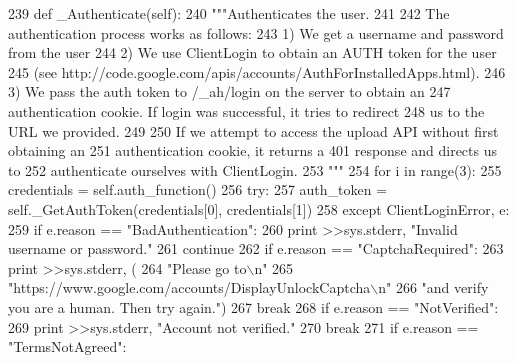 \begin{DoxyCode}
239   \textcolor{keyword}{def }\_Authenticate(self):
240     \textcolor{stringliteral}{"""Authenticates the user.}
241 \textcolor{stringliteral}{}
242 \textcolor{stringliteral}{    The authentication process works as follows:}
243 \textcolor{stringliteral}{     1) We get a username and password from the user}
244 \textcolor{stringliteral}{     2) We use ClientLogin to obtain an AUTH token for the user}
245 \textcolor{stringliteral}{        (see http://code.google.com/apis/accounts/AuthForInstalledApps.html).}
246 \textcolor{stringliteral}{     3) We pass the auth token to /\_ah/login on the server to obtain an}
247 \textcolor{stringliteral}{        authentication cookie. If login was successful, it tries to redirect}
248 \textcolor{stringliteral}{        us to the URL we provided.}
249 \textcolor{stringliteral}{}
250 \textcolor{stringliteral}{    If we attempt to access the upload API without first obtaining an}
251 \textcolor{stringliteral}{    authentication cookie, it returns a 401 response and directs us to}
252 \textcolor{stringliteral}{    authenticate ourselves with ClientLogin.}
253 \textcolor{stringliteral}{    """}
254     \textcolor{keywordflow}{for} i \textcolor{keywordflow}{in} range(3):
255       credentials = self.auth\_function()
256       \textcolor{keywordflow}{try}:
257         auth\_token = self.\_GetAuthToken(credentials[0], credentials[1])
258       \textcolor{keywordflow}{except} ClientLoginError, e:
259         \textcolor{keywordflow}{if} e.reason == \textcolor{stringliteral}{"BadAuthentication"}:
260           \textcolor{keywordflow}{print} >>sys.stderr, \textcolor{stringliteral}{"Invalid username or password."}
261           \textcolor{keywordflow}{continue}
262         \textcolor{keywordflow}{if} e.reason == \textcolor{stringliteral}{"CaptchaRequired"}:
263           \textcolor{keywordflow}{print} >>sys.stderr, (
264               \textcolor{stringliteral}{"Please go to\(\backslash\)n"}
265               \textcolor{stringliteral}{"https://www.google.com/accounts/DisplayUnlockCaptcha\(\backslash\)n"}
266               \textcolor{stringliteral}{"and verify you are a human.  Then try again."})
267           \textcolor{keywordflow}{break}
268         \textcolor{keywordflow}{if} e.reason == \textcolor{stringliteral}{"NotVerified"}:
269           \textcolor{keywordflow}{print} >>sys.stderr, \textcolor{stringliteral}{"Account not verified."}
270           \textcolor{keywordflow}{break}
271         \textcolor{keywordflow}{if} e.reason == \textcolor{stringliteral}{"TermsNotAgreed"}:

\end{DoxyCode}
